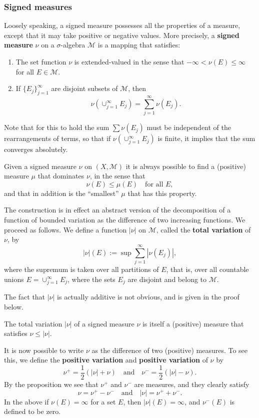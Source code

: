 \subsubsection{Signed measures}

Loosely speaking, a signed measure possesses all the properties of a measure, 
except that it may take positive or negative values. 
More precisely, 
a \textbf{signed measure} $\nu$ on a $\sigma$-algebra $\mathcal M$ is a mapping that satisfies:
\begin{enumerate}
  \item The set function $\nu$ is extended-valued in the sense that $-\infty<\nu(E)\leq\infty$ for all $E\in\mathcal M$.
  \item If $\{E_j\}_{j=1}^\infty$ are disjoint subsets of $\mathcal M$, then 
  \[
  \nu\left(\cup_{j=1}^\infty E_j\right) = \sum_{j=1}^\infty\nu(E_j).
  \]
\end{enumerate}

Note that for this to hold the sum $\sum\nu(E_j)$ must be independent of the rearrangements of terms,
so that if $\nu(\cup_{j=1}^\infty E_j)$ is finite, 
it implies that the sum converges absolutely.

Given a signed measure $\nu$ on $(X,\mathcal M)$ it is always possible to find a 
(positive) measure $\mu$ that dominates $\nu$, in the sense that 
\[
\nu(E)\leq\mu(E)\quad \text{for all } E,
\]
and that in addition is the ``smallest'' $\mu$ that has this property.

The construction is in effect an abstract version of the decomposition of a function of bounded variation 
as the difference of two increasing functions. 
We proceed as follows.
We define a function $|\nu|$ on $\mathcal M$, called the \textbf{total variation} of $\nu$, by 
\[
|\nu|(E) := \sup\sum_{j=1}^\infty|\nu(E_j)|,
\]
where the supremum is taken over all partitions of $E$, 
that is, over all countable unions $E=\cup_{j=1}^\infty E_j$, 
where the sets $E_j$ are disjoint and belong to $\mathcal M$.

The fact that $|\nu|$ is actually additive is not obvious, and is given in the proof below.

\begin{proposition}
  The total variation $|\nu|$ of a signed measure $\nu$ is itself a (positive) measure that satisfies $\nu\leq|\nu|$.
\end{proposition}

It is now possible to write $\nu$ as the difference of two (positive) measures.
To see this, we define the \textbf{positive variation} and \textbf{positive variation} of $\nu$ by 
\[
\nu^+ = \frac12(|\nu|+\nu)
\quad\text{and}\quad
\nu^- = \frac12(|\nu|-\nu).
\]
By the proposition we see that $\nu^+$ and $\nu^-$ are measures, and they clearly satisfy 
\[
\nu = \nu^+ - \nu^-
\quad\text{and}\quad
|\nu| = \nu^+ + \nu^-.
\]
In the above if $\nu(E) = \infty$ for a set $E$, then $|\nu|(E) = \infty$, and $\nu^-(E)$ is defined to be zero.

